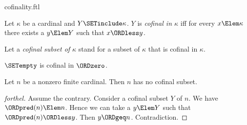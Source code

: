 \documentclass{stex}
\begin{document}
\begin{smodule}{cofinality.ftl}

\begin{definition}[forthel,id=SET_THEORY_06_5621203645212879]
  Let $\kappa$ be a cardinal and $Y \SETinclude \kappa$.
  $Y$ is \emph{cofinal in $\kappa$} iff for every $x \Elem \kappa$ there exists a $y \Elem Y$ such that $x \ORDless y$.

  Let a \emph{cofinal subset of $\kappa$} stand for a subset of $\kappa$ that is cofinal in $\kappa$.
\end{definition}

\begin{proposition}[forthel,id=SET_THEORY_06_1092835738982753]
  $\SETempty$ is cofinal in $\ORDzero$.
\end{proposition}

\begin{proposition}[forthel,id=SET_THEORY_06_7029348571092835]
  Let $n$ be a nonzero finite cardinal.
  Then $n$ has no cofinal subset.
\end{proposition}
\begin{proof}[forthel]
  Assume the contrary.
  Consider a cofinal subset $Y$ of $n$.
  We have $\ORDpred(n) \Elem n$.
  Hence we can take a $y \Elem Y$ such that $\ORDpred(n) \ORDless y$.
  Then $y \ORDgeq n$.
  Contradiction.
\end{proof}
\end{smodule}
\end{document}
